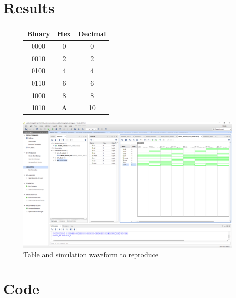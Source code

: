 \documentclass[11pt]{article}
\newcommand{\Verilog}[2][]{%
	
}
\begin{document}
	\section*{Results}
	\begin{figure}[ht]\centering
		\begin{center}
			\begin{tabular}{c|c|c}
				\toprule
				Binary & Hex & Decimal \\
				\midrule
				0000 & 0 & 0 \\
				0010 & 2 & 2 \\
				0100 & 4 & 4 \\
				0110 & 6 & 6 \\
				1000 & 8 & 8 \\
				1010 & A & 10 \\
				\bottomrule
			\end{tabular}
		\end{center}
		\includegraphics[width=1\textwidth,trim=18.5cm 15.5cm .5cm 4.5cm,clip]{lab1_example_screenshot}
		\caption{Table and simulation waveform to reproduce}
		\label{fig:Simulation}
	\end{figure}

	
	
	\section*{Code}
	
	\Verilog[caption=File-included Verilog code example,label=code:file_ex]{lab1_example_code.sv}
	
	
\end{document}
